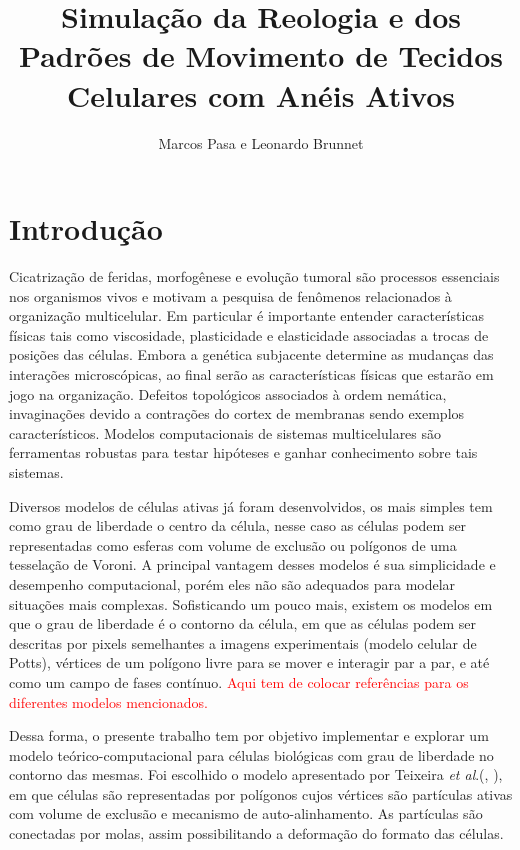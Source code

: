 \documentclass{article}
\title{Simulação da Reologia e dos Padrões de Movimento de Tecidos Celulares com Anéis Ativos}
\author{Marcos Pasa e Leonardo Brunnet}
\theoremstyle{definition}
\begin{document}
\maketitle

\section{Introdução}
Cicatrização de feridas, morfogênese e evolução tumoral são processos essenciais nos organismos vivos e motivam a pesquisa de fenômenos relacionados à organização multicelular. Em particular é importante entender características físicas tais como viscosidade, plasticidade e elasticidade associadas a trocas de posições das células. Embora a genética subjacente determine as mudanças das interações microscópicas, ao final serão as características físicas que estarão em jogo na organização. Defeitos topológicos associados à ordem nemática, invaginações devido a contrações do cortex de membranas sendo  exemplos característicos. Modelos computacionais de sistemas multicelulares são ferramentas robustas para testar hipóteses e ganhar conhecimento sobre tais sistemas.

Diversos modelos de células ativas já foram desenvolvidos, os mais simples tem como grau de liberdade o centro da célula, nesse caso as células podem ser representadas como esferas com volume de exclusão ou polígonos de uma tesselação de Voroni. A principal vantagem desses modelos é sua simplicidade e desempenho computacional, porém eles não são adequados para modelar situações mais complexas. Sofisticando um pouco mais, existem os modelos em que o grau de liberdade é o contorno da célula, em que as células podem ser descritas por pixels semelhantes a imagens experimentais (modelo celular de Potts), vértices de um polígono livre para se mover e interagir par a par, e até como um campo de fases contínuo.
\textcolor{red}{Aqui tem de colocar referências para os diferentes modelos mencionados.}

Dessa forma, o presente trabalho tem por objetivo implementar e explorar um modelo teórico-computacional para células biológicas com grau de liberdade no contorno das mesmas. Foi escolhido o modelo apresentado por Teixeira \textit{et al}.(\cite{teixeira_single_2021}, \cite{teixeira_segregation_2024}), em que células são representadas por polígonos cujos vértices são partículas ativas com volume de exclusão e mecanismo de auto-alinhamento. As partículas são conectadas por molas, assim possibilitando a deformação do formato das células.
\end{document}
